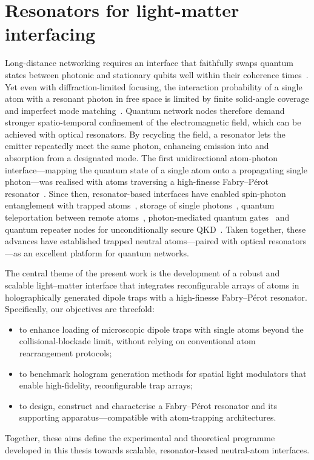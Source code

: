 \documentclass[../Thesis-IJspeert.tex]{subfiles}
\begin{document}
\section{Resonators for light-matter interfacing}
Long-distance networking requires an interface that faithfully swaps quantum states between photonic and stationary qubits well within their coherence times~\cite{Reiserer2015}. Yet even with diffraction-limited focusing, the interaction probability of a single atom with a resonant photon in free space is limited by finite solid-angle coverage and imperfect mode matching~\cite{Leuchs2013}. Quantum network nodes therefore demand stronger spatio-temporal confinement of the electromagnetic field, which can be achieved with optical resonators. By recycling the field, a resonator lets the emitter repeatedly meet the same photon, enhancing emission into and absorption from a designated mode. The first unidirectional atom-photon interface---mapping the quantum state of a single atom onto a propagating single photon---was realised with  atoms traversing a high-finesse Fabry--Pérot resonator~\cite{Wilk2007}. Since then, resonator-based interfaces have enabled spin-photon entanglement with trapped atoms~\cite{Weber2009}, storage of single photons~\cite{rempe2012}, quantum teleportation between remote atoms~\cite{Nolleke2013,Langenfeld2021}, photon-mediated quantum gates~\cite{Reiserer2014,Daiss2021} and quantum repeater nodes for unconditionally secure QKD~\cite{Langenfeld2021b}. Taken together, these advances have established trapped neutral atoms---paired with optical resonators---as an excellent platform for quantum networks.

The central theme of the present work is the development of a robust and scalable light--matter interface that integrates reconfigurable arrays of atoms in holographically generated dipole traps with a high-finesse Fabry--Pérot resonator. Specifically, our objectives are threefold:
\begin{itemize}[leftmargin=*, labelsep=1em]
	\item to enhance loading of microscopic dipole traps with single atoms beyond the collisional-blockade limit, without relying on conventional atom rearrangement protocols;
	\item to benchmark hologram generation methods for spatial light modulators that enable high-fidelity, reconfigurable trap arrays;
	\item to design, construct and characterise a Fabry--Pérot resonator and its supporting apparatus---compatible with atom-trapping architectures.
\end{itemize}
Together, these aims define the experimental and theoretical programme developed in this thesis towards scalable, resonator-based neutral-atom interfaces.
\end{document}
